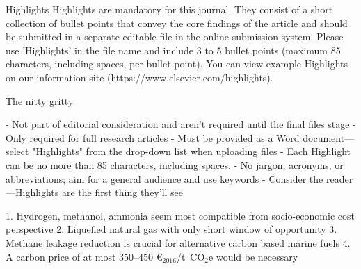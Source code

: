Highlights
Highlights are mandatory for this journal. They consist of a short collection of bullet points that convey the core findings of the article and should be submitted in a separate editable file in the online submission system. Please use 'Highlights' in the file name and include 3 to 5 bullet points (maximum 85 characters, including spaces, per bullet point). You can view example Highlights on our information site (https://www.elsevier.com/highlights).

The nitty gritty

- Not part of editorial consideration and aren't required until the final files stage
- Only required for full research articles
- Must be provided as a Word document— select "Highlights" from the drop-down list when uploading files
- Each Highlight can be no more than 85 characters, including spaces.
- No jargon, acronyms, or abbreviations; aim for a general audience and use keywords
- Consider the reader—Highlights are the first thing they'll see

1. Hydrogen, methanol, ammonia seem most compatible from socio-economic cost perspective
2. Liquefied natural gas with only short window of opportunity
3. Methane leakage reduction is crucial for alternative carbon based marine fuels
4. A carbon price of at most 350--450 \euro$_{2016}$/t~CO$_2$e would be necessary